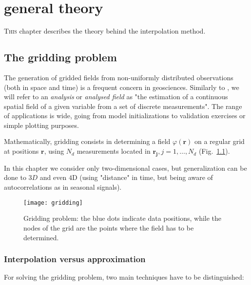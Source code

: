 \chapter{\diva general theory\label{chaptheory}}


\lettrine[lines=2, loversize=-0.1, lraise=0.1]{T}{his} chapter describes the theory behind the \diva interpolation method. 

\minitoc


\section{The gridding problem\label{gridding}}

The generation of gridded fields from non-uniformly distributed observations (both in space and time) is a frequent concern in geosciences. Similarly to \citet{OOYAMA87}, we will refer to an \textit{analysis} or \textit{analysed field} as "the estimation of a continuous spatial field of a given variable from a set of discrete measurements". The range of applications is wide, going from model initializations to validation exercises  or simple plotting purposes. 

Mathematically, gridding consists in determining a field $\varphi(\mathbf{r})$ on a regular grid at positions $\mathbf{r}$, using $N_{d}$ measurements located in $\mathbf{r_{j}}, j=1,\ldots, N_{d}$ (Fig.~\ref{gridproblem}).  

In this chapter we consider only two-dimensional cases, but generalization can be done to $3D$ and even $4$D (using "distance" in time, but being aware of autocorrelations as in seasonal signals).

\begin{figure}[htpb]
	\centering
	\parbox{.5\textwidth}{
		\texttt{[image: gridding]}
		}\parbox{.5\textwidth}{
		\caption{Gridding problem: the blue dots indicate data positions, while the nodes of the grid  are the points where the field has to be determined.\label{gridproblem}}
		}
\end{figure}

\subsection{Interpolation versus approximation}

For solving the gridding problem, two main techniques have to be distinguished:

